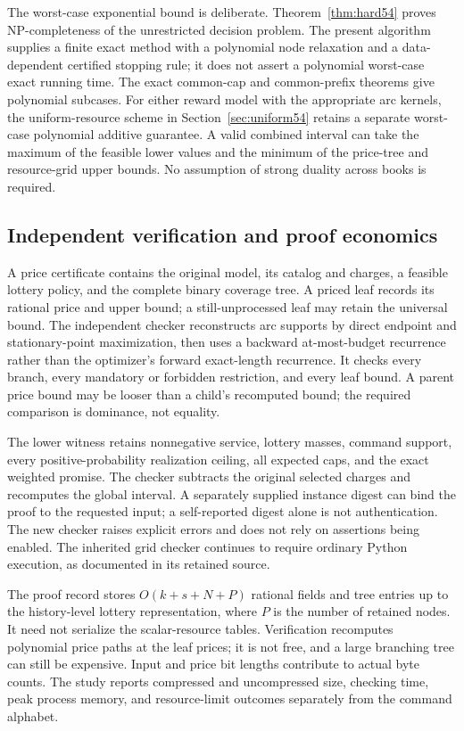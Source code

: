 \documentclass[11pt,letterpaper]{article}
\theoremstyle{definition}\newtheorem{remark}[theorem]{Remark}
\begin{document}
The worst-case exponential bound is deliberate. Theorem~\ref{thm:hard54} proves NP-completeness of the unrestricted decision problem. The present algorithm supplies a finite exact method with a polynomial node relaxation and a data-dependent certified stopping rule; it does not assert a polynomial worst-case exact running time. The exact common-cap and common-prefix theorems give polynomial subcases. For either reward model with the appropriate arc kernels, the uniform-resource scheme in Section~\ref{sec:uniform54} retains a separate worst-case polynomial additive guarantee. A valid combined interval can take the maximum of the feasible lower values and the minimum of the price-tree and resource-grid upper bounds. No assumption of strong duality across books is required.

\subsection{Independent verification and proof economics}
A price certificate contains the original model, its catalog and charges, a feasible lottery policy, and the complete binary coverage tree. A priced leaf records its rational price and upper bound; a still-unprocessed leaf may retain the universal bound. The independent checker reconstructs arc supports by direct endpoint and stationary-point maximization, then uses a backward at-most-budget recurrence rather than the optimizer's forward exact-length recurrence. It checks every branch, every mandatory or forbidden restriction, and every leaf bound. A parent price bound may be looser than a child's recomputed bound; the required comparison is dominance, not equality.

The lower witness retains nonnegative service, lottery masses, command support, every positive-probability realization ceiling, all expected caps, and the exact weighted promise. The checker subtracts the original selected charges and recomputes the global interval. A separately supplied instance digest can bind the proof to the requested input; a self-reported digest alone is not authentication. The new checker raises explicit errors and does not rely on assertions being enabled. The inherited grid checker continues to require ordinary Python execution, as documented in its retained source.

The proof record stores $O(k+s+N+P)$ rational fields and tree entries up to the history-level lottery representation, where $P$ is the number of retained nodes. It need not serialize the scalar-resource tables. Verification recomputes polynomial price paths at the leaf prices; it is not free, and a large branching tree can still be expensive. Input and price bit lengths contribute to actual byte counts. The study reports compressed and uncompressed size, checking time, peak process memory, and resource-limit outcomes separately from the command alphabet.
\end{document}
